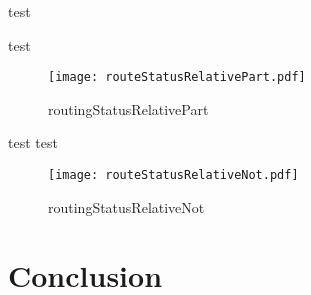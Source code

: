 \documentclass[11pt,a4paper]{scrreprt}
\begin{document}
test

test

\begin{figure}[h!]
\centering
\texttt{[image: routeStatusRelativePart.pdf]}
\caption{routingStatusRelativePart}
\label{fig:routingStatusRelativePart}
\end{figure}

test 
\clearpage
test

\begin{figure}[h!]
\centering
\texttt{[image: routeStatusRelativeNot.pdf]}
\caption{routingStatusRelativeNot}
\label{fig:routingStatusRelativeNot}
\end{figure}

\chapter{Conclusion}
\end{document}
